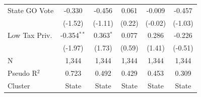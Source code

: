 \begin{tabular*}{\textwidth}{@{\extracolsep{\fill}}lccccc}
   State GO Vote        & -0.330         & -0.456        & 0.061         & -0.009         & -0.457\\   
                        & (-1.52)       & (-1.11)      & (0.22)       & (-0.02)       & (-1.03)\\   
   Low Tax Priv.        & -0.354$^{**}$  & 0.363$^{*}$   & 0.077         & 0.286          & -0.226\\   
                        & (-1.97)       & (1.73)       & (0.59)       & (1.41)        & (-0.51)\\   
   \hline
   N         & 1,344          & 1,344         & 1,344         & 1,344          & 1,344\\  
   Pseudo R$^2$         & 0.723          & 0.492         & 0.429         & 0.453          & 0.309\\  
   Cluster              & State & State & State & State & State\\  
   \bottomrule
\end{tabular*}
\par\endgroup

